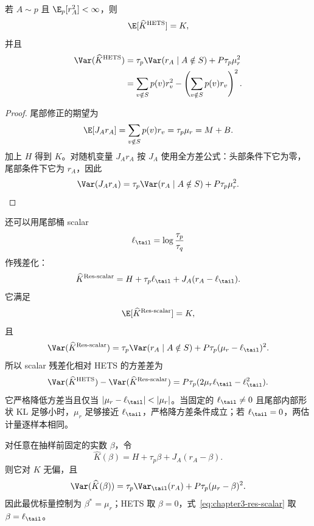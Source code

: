 \begin{theorem}
\label{thm:chapter3-ema-scalar}
若 $A\sim p$ 且 $\E_p[r_A^2]<\infty$，则
\[
 \E[\widehat K^{\mathrm{HETS}}]=K,
\]
并且
\begin{align}
 \Var(\widehat K^{\mathrm{HETS}})
 &=\tau_p\Var(r_A\mid A\notin S)+P\tau_p\mu_r^2\\
 &=\sum_{v\notin S}p(v)r_v^2
   -\left(\sum_{v\notin S}p(v)r_v\right)^2.
 \label{eq:chapter3-ema-scalar-var}
\end{align}
\end{theorem}

\begin{proof}
尾部修正的期望为
\[
 \E[J_A r_A]=\sum_{v\notin S}p(v)r_v=\tau_p\mu_r=M+B.
\]
加上 $H$ 得到 $K$。对随机变量 $J_A r_A$ 按 $J_A$ 使用全方差公式：头部条件下它为零，尾部条件下它为 $r_A$，因此
\[
 \Var(J_A r_A)=\tau_p\Var(r_A\mid A\notin S)+P\tau_p\mu_r^2.
\]
\end{proof}

还可以用尾部桶 scalar
\[
 \ell_{\tail}=\log\frac{\tau_p}{\tau_q}
\]
作残差化：
\begin{equation}
 \widehat K^{\mathrm{Res\text{-}scalar}}
 =H+\tau_p\ell_{\tail}+J_A(r_A-\ell_{\tail}).
 \label{eq:chapter3-res-scalar}
\end{equation}
它满足
\[
 \E[\widehat K^{\mathrm{Res\text{-}scalar}}]=K,
\]
且
\begin{equation}
 \Var(\widehat K^{\mathrm{Res\text{-}scalar}})
 =\tau_p\Var(r_A\mid A\notin S)+P\tau_p(\mu_r-\ell_{\tail})^2.
 \label{eq:chapter3-res-scalar-var}
\end{equation}
所以 scalar 残差化相对 HETS 的方差差为
\begin{equation}
 \Var(\widehat K^{\mathrm{HETS}})-\Var(\widehat K^{\mathrm{Res\text{-}scalar}})
 =P\tau_p(2\mu_r\ell_{\tail}-\ell_{\tail}^2).
 \label{eq:chapter3-res-scalar-gap}
\end{equation}
它严格降低方差当且仅当 $|\mu_r-\ell_{\tail}|<|\mu_r|$。当固定的 $\ell_{\tail}\ne0$ 且尾部内部形状 KL 足够小时，$\mu_r$ 足够接近 $\ell_{\tail}$，严格降方差条件成立；若 $\ell_{\tail}=0$，两估计量逐样本相同。

\begin{proposition}[标量尾部控制族]
对任意在抽样前固定的实数 $\beta$，令
\[
 \widehat K(\beta)=H+\tau_p\beta+J_A(r_A-\beta).
\]
则它对 $K$ 无偏，且
\[
 \Var(\widehat K(\beta))
 =\tau_p\Var_{\tail}(r_A)+P\tau_p(\mu_r-\beta)^2.
\]
因此最优标量控制为 $\beta^*=\mu_r$；HETS 取 $\beta=0$，式~\eqref{eq:chapter3-res-scalar} 取 $\beta=\ell_{\tail}$。
\end{proposition}

